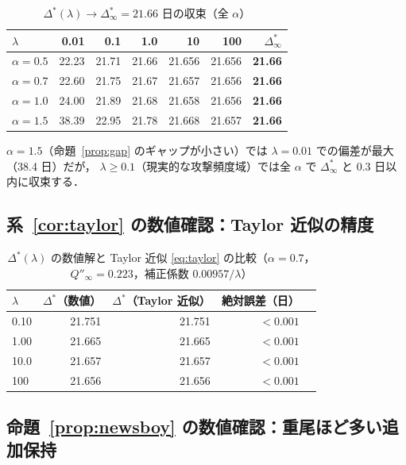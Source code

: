 \documentclass[12pt,a4paper]{article}
\theoremstyle{plain}
\theoremstyle{definition}
\theoremstyle{remark}
\newcommand{\Dopt}{\Delta^{*}}
\newcommand{\Dinf}{\Delta^{*}_{\infty}}
\begin{document}
\begin{table}[h]
\centering
\caption{$\Dopt(\lambda)\to\Dinf=21.66$ 日の収束（全 $\alpha$）}
\label{tab:convergence}
\begin{tabular}{@{}lrrrrrr@{}}
\toprule
$\lambda$ & 0.01 & 0.1 & 1.0 & 10 & 100 & $\Dinf$ \\
\midrule
$\alpha=0.5$ & 22.23 & 21.71 & 21.66 & 21.656 & 21.656 & \textbf{21.66} \\
$\alpha=0.7$ & 22.60 & 21.75 & 21.67 & 21.657 & 21.656 & \textbf{21.66} \\
$\alpha=1.0$ & 24.00 & 21.89 & 21.68 & 21.658 & 21.656 & \textbf{21.66} \\
$\alpha=1.5$ & 38.39 & 22.95 & 21.78 & 21.668 & 21.657 & \textbf{21.66} \\
\bottomrule
\end{tabular}
\end{table}

$\alpha=1.5$（命題~\ref{prop:gap} のギャップが小さい）では $\lambda=0.01$ での偏差が最大（38.4 日）だが，
$\lambda\ge0.1$（現実的な攻撃頻度域）では全 $\alpha$ で $\Dinf$ と $0.3$ 日以内に収束する．

\subsection{系~\ref{cor:taylor} の数値確認：Taylor 近似の精度}

\begin{table}[h]
\centering
\caption{$\Dopt(\lambda)$ の数値解と Taylor 近似 \eqref{eq:taylor} の比較（$\alpha=0.7$，
$Q''_\infty=0.223$，補正係数 $0.00957/\lambda$）}
\label{tab:taylor}
\begin{tabular}{@{}lrrrr@{}}
\toprule
$\lambda$ & $\Dopt$（数値）& $\Dopt$（Taylor 近似）& 絶対誤差（日）\\
\midrule
0.10 & 21.751 & 21.751 & $<0.001$ \\
1.00 & 21.665 & 21.665 & $<0.001$ \\
10.0 & 21.657 & 21.657 & $<0.001$ \\
100  & 21.656 & 21.656 & $<0.001$ \\
\bottomrule
\end{tabular}
\end{table}

\subsection{命題~\ref{prop:newsboy} の数値確認：重尾ほど多い追加保持}
\end{document}
